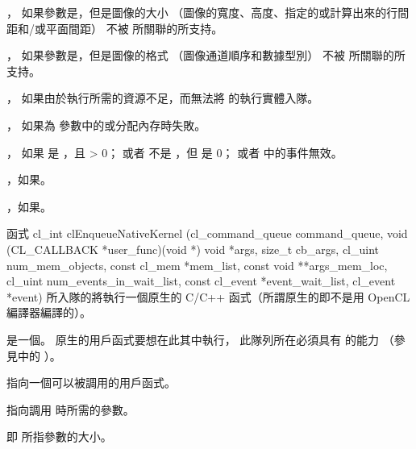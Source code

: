 \item {}，
如果參數是，但是圖像的大小
（圖像的寬度、高度、指定的或計算出來的行間距和/或平面間距）
不被  所關聯的所支持。

\item {}，
如果參數是，但是圖像的格式
（圖像通道順序和數據型別）
不被  所關聯的所支持。

\item {}，
如果由於執行所需的資源不足，而無法將  的執行實體入隊。

\item {}，
如果為  參數中的或分配內存時失敗。

\item {}，
  如果  是 ，且  > 0；
  或者  不是 ，但  是 0；
  或者  中的事件無效。

\item {}，如果\scdevfailres。

\item {}，如果\schostfailres。
\stopigBase

函式
\startCLFUNC
cl_int clEnqueueNativeKernel (cl_command_queue command_queue,
			void (CL_CALLBACK *user_func)(void *)
			void *args,
			size_t cb_args,
			cl_uint num_mem_objects,
			const cl_mem *mem_list,
			const void **args_mem_loc,
			cl_uint num_events_in_wait_list,
			const cl_event *event_wait_list,
			cl_event *event)
\stopCLFUNC
所入隊的將執行一個原生的 C/C++ 函式（所謂原生的即不是用 OpenCL 編譯器編譯的）。

 是一個。
原生的用戶函式要想在此其中執行，
此隊列所在必須具有  的能力
（參見中的 ）。

 指向一個可以被調用的用戶函式。

 指向調用  時所需的參數。

 即  所指參數的大小。

